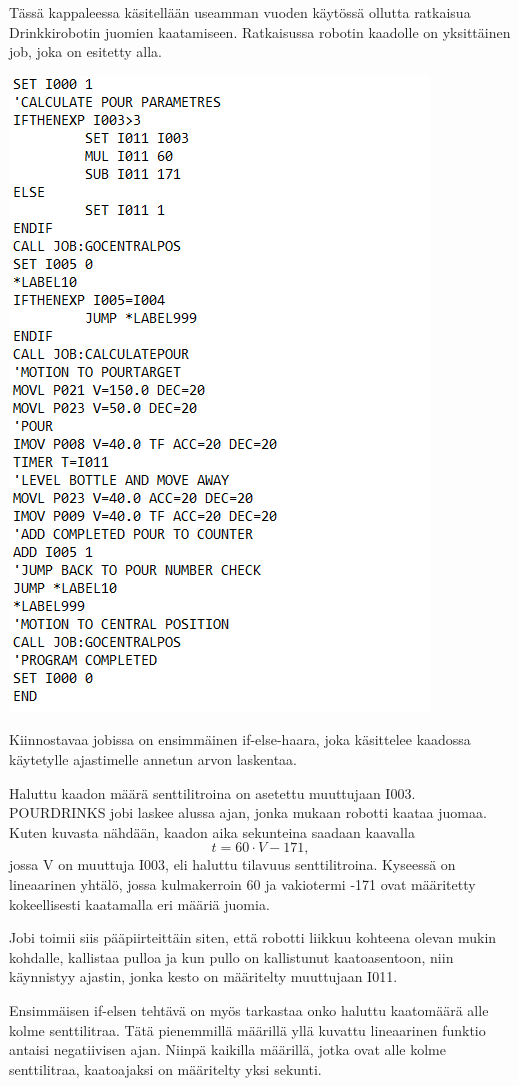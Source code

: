 Tässä kappaleessa käsitellään useamman vuoden käytössä ollutta ratkaisua Drinkkirobotin juomien kaatamiseen.   Ratkaisussa robotin kaadolle on yksittäinen job, joka on esitetty alla.

\includegraphics{img/POURDRINKS.png}

Kiinnostavaa jobissa on ensimmäinen if-else-haara, joka käsittelee kaadossa käytetylle ajastimelle annetun arvon laskentaa.

Haluttu kaadon määrä senttilitroina on asetettu muuttujaan I003. POURDRINKS jobi laskee alussa ajan, jonka mukaan robotti kaataa juomaa. Kuten kuvasta nähdään, kaadon aika sekunteina saadaan kaavalla
\[t = 60 \cdot V - 171, \]
jossa V on muuttuja I003, eli haluttu tilavuus senttilitroina. Kyseessä on lineaarinen yhtälö, jossa kulmakerroin 60 ja vakiotermi -171 ovat määritetty kokeellisesti kaatamalla eri määriä juomia.

Jobi toimii siis pääpiirteittäin siten, että robotti liikkuu kohteena olevan mukin kohdalle, kallistaa pulloa ja kun pullo on kallistunut kaatoasentoon, niin käynnistyy ajastin, jonka kesto on määritelty muuttujaan I011.

Ensimmäisen if-elsen tehtävä on myös tarkastaa onko haluttu kaatomäärä alle kolme senttilitraa. Tätä pienemmillä määrillä yllä kuvattu lineaarinen funktio antaisi negatiivisen ajan. Niinpä kaikilla määrillä, jotka ovat alle kolme senttilitraa, kaatoajaksi on määritelty yksi sekunti.
